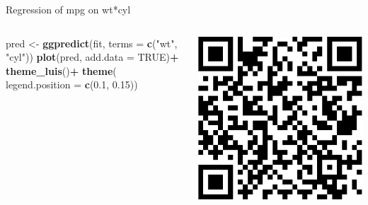 \documentclass[australian,ignorenonframetext,aspectratio=169]{beamer}
\newenvironment{Shaded}{\begin{snugshade}}{\end{snugshade}}
\newcommand{\DataTypeTok}[1]{\textcolor[rgb]{0.13,0.29,0.53}{#1}}
\newcommand{\FloatTok}[1]{\textcolor[rgb]{0.00,0.00,0.81}{#1}}
\newcommand{\KeywordTok}[1]{\textcolor[rgb]{0.13,0.29,0.53}{\textbf{#1}}}
\newcommand{\NormalTok}[1]{#1}
\newcommand{\OperatorTok}[1]{\textcolor[rgb]{0.81,0.36,0.00}{\textbf{#1}}}
\newcommand{\OtherTok}[1]{\textcolor[rgb]{0.56,0.35,0.01}{#1}}
\newcommand{\StringTok}[1]{\textcolor[rgb]{0.31,0.60,0.02}{#1}}
\begin{document}
\begin{frame}[fragile]{Regression of mpg on wt*cyl}
\protect\hypertarget{regression-of-mpg-on-wtcyl-1}{}

\begin{columns}[T]
\begin{column}{0.5\textwidth}
\tiny

\begin{Shaded}
\begin{Highlighting}[]
\NormalTok{pred \textless{}{-}}\StringTok{ }\KeywordTok{ggpredict}\NormalTok{(fit, }\DataTypeTok{terms =} \KeywordTok{c}\NormalTok{(}\StringTok{"wt"}\NormalTok{, }\StringTok{"cyl"}\NormalTok{))}
\KeywordTok{plot}\NormalTok{(pred, }\DataTypeTok{add.data =} \OtherTok{TRUE}\NormalTok{)}\OperatorTok{+}
\StringTok{  }\KeywordTok{theme\_luis}\NormalTok{()}\OperatorTok{+}
\StringTok{  }\KeywordTok{theme}\NormalTok{( }\DataTypeTok{legend.position =} \KeywordTok{c}\NormalTok{(}\FloatTok{0.1}\NormalTok{, }\FloatTok{0.15}\NormalTok{))}
\end{Highlighting}
\end{Shaded}
\end{column}

\begin{column}{0.5\textwidth}
\includegraphics{../graphs/unnamed-chunk-16-1.pdf}
\end{column}
\end{columns}

\end{frame}
\end{document}
